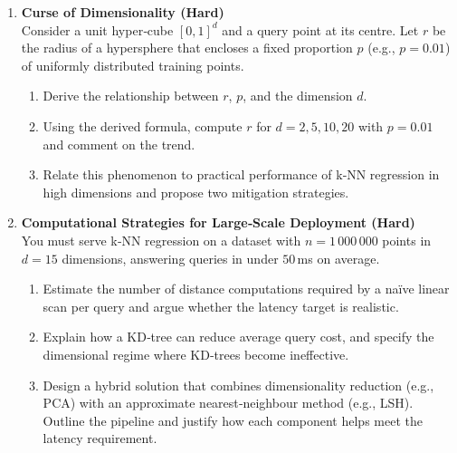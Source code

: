 \documentclass[12pt, a4paper]{article}
\begin{document}
\begin{enumerate}
  \item \textbf{Curse of Dimensionality (Hard)}\\
    Consider a unit hyper‑cube \([0,1]^d\) and a query point at its centre. Let \(r\) be the radius of a hypersphere that encloses a fixed proportion \(p\) (e.g., \(p=0.01\)) of uniformly distributed training points.
    \begin{enumerate}[label=\alph)]
      \item Derive the relationship between \(r\), \(p\), and the dimension \(d\).
      \item Using the derived formula, compute \(r\) for \(d=2,5,10,20\) with \(p=0.01\) and comment on the trend.
      \item Relate this phenomenon to practical performance of k‑NN regression in high dimensions and propose two mitigation strategies.
    \end{enumerate}

  \item \textbf{Computational Strategies for Large‑Scale Deployment (Hard)}\\
    You must serve k‑NN regression on a dataset with \(n=1\,000\,000\) points in \(d=15\) dimensions, answering queries in under \(50\) ms on average.
    \begin{enumerate}[label=\alph)]
      \item Estimate the number of distance computations required by a naïve linear scan per query and argue whether the latency target is realistic.
      \item Explain how a KD‑tree can reduce average query cost, and specify the dimensional regime where KD‑trees become ineffective.
      \item Design a hybrid solution that combines dimensionality reduction (e.g., PCA) with an approximate nearest‑neighbour method (e.g., LSH). Outline the pipeline and justify how each component helps meet the latency requirement.
    \end{enumerate}


\end{enumerate}
\end{document}
